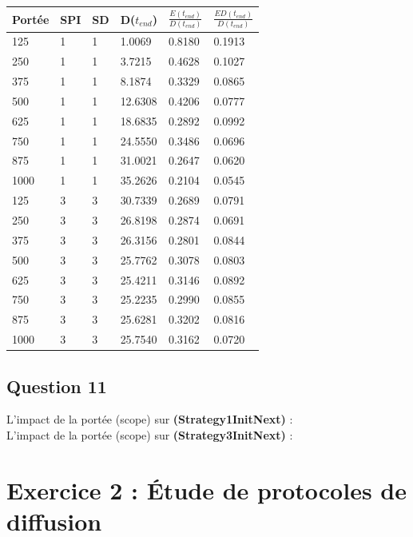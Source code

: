 \documentclass[10pt]{report}
\begin{document}
\begin{center}
\begin{tabular}{|l|l|l|l|l|l|} \hline
  Portée & SPI & SD & D($t_{end}$) & $\frac{E(t_{end})}{D(t_{end})}$ & $\frac{ED(t_{end})}{D(t_{end})}$\\ \hline
	125 & 1 & 1 & 1.0069 & 0.8180 & 0.1913\\ \hline
	250 & 1 & 1 & 3.7215 & 0.4628 & 0.1027\\ \hline
	375 & 1 & 1 & 8.1874 & 0.3329 & 0.0865\\ \hline
	500 & 1 & 1 & 12.6308 & 0.4206 & 0.0777\\ \hline
	625 & 1 & 1 & 18.6835 & 0.2892 & 0.0992\\ \hline
	750 & 1 & 1 & 24.5550 & 0.3486 & 0.0696\\ \hline
	875 & 1 & 1 & 31.0021 & 0.2647 & 0.0620\\ \hline
	1000 & 1 & 1 & 35.2626 & 0.2104 & 0.0545\\ \hline
	125 & 3 & 3 & 30.7339 & 0.2689 & 0.0791\\ \hline
	250 & 3 & 3 & 26.8198 & 0.2874 & 0.0691\\ \hline
	375 & 3 & 3 & 26.3156 & 0.2801 & 0.0844\\ \hline
	500 & 3 & 3 & 25.7762 & 0.3078 & 0.0803\\ \hline
	625 & 3 & 3 & 25.4211 & 0.3146 & 0.0892\\ \hline
	750 & 3 & 3 & 25.2235 & 0.2990 & 0.0855\\ \hline
	875 & 3 & 3 & 25.6281 & 0.3202 & 0.0816\\ \hline
	1000 & 3 & 3 & 25.7540 & 0.3162 & 0.0720\\ \hline
\end{tabular}
\end{center}

\subsection{Question 11}

L'impact de la portée (scope) sur \textbf{(Strategy1InitNext)} :\\

L'impact de la portée (scope) sur \textbf{(Strategy3InitNext)} :\\

\newpage
\section{Exercice 2 : Étude de protocoles de diffusion}
\end{document}

